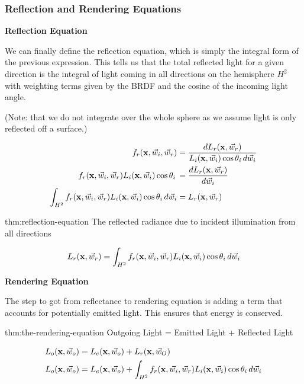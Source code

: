 \documentclass{article}
\begin{document}
\subsubsection{Reflection and Rendering Equations}

\textbf{Reflection Equation}

\vspace{5px}

We can finally define the reflection equation, which is simply the integral form of the previous expression.
This tells us that the total reflected light for a given direction is the integral of light coming in all 
directions on the hemisphere \(H^2\) with weighting terms given by the BRDF and the cosine of the 
incoming light angle.

\vspace{5px}

(Note: that we do not integrate over the whole sphere as we assume light is only reflected off a surface.)

\def\ReflectedLight{
    \int_{H^2} f_r(\text{\textbf{x}}, \vec{w}_i, \vec{w}_r)L_i(\text{\textbf{x}}, \vec{w}_i) \cos \theta_i \, d \vec{w}_i
}

\begin{align*}
    f_r(\text{\textbf{x}}, \vec{w}_i, \vec{w}_r) &= \frac{d L_r(\text{\textbf{x}}, \vec{w}_r)}
            {L_i(\text{\textbf{x}}, \vec{w}_i) \cos \theta_i \, d\vec{w}_i}\\
    f_r(\text{\textbf{x}}, \vec{w}_i, \vec{w}_r)L_i(\text{\textbf{x}}, \vec{w}_i) \cos \theta_i \,  
        &= \frac{d L_r(\text{\textbf{x}}, \vec{w}_r)}{d\vec{w}_i}\\
    \ReflectedLight &= L_r(\text{\textbf{x}}, \vec{w}_r)
\end{align*}

\begin{defin}{thm:reflection-equation}
    The reflected radiance due to incident illumination from all directions

    \[
        L_r(\text{\textbf{x}}, \vec{w}_r) = \ReflectedLight
    \]
\end{defin}

\textbf{Rendering Equation}

\vspace{10px}

The step to got from reflectance to rendering equation is adding a term that accounts for potentially
emitted light. This ensures that energy is conserved.

\begin{defin}{thm:the-rendering-equation}
    Outgoing Light = Emitted Light + Reflected Light

    \begin{alignat*}{1}
        &L_{o}(\text{\textbf{x}}, \vec{w}_{o}) = L_e (\text{\textbf{x}}, \vec{w}_{o}) + L_r(\text{\textbf{x}}, \vec{w}_{O}) \\
        &L_{o}(\text{\textbf{x}}, \vec{w}_{o}) = L_e (\text{\textbf{x}}, \vec{w}_{o}) + \ReflectedLight
    \end{alignat*}
\end{defin}
\end{document}
